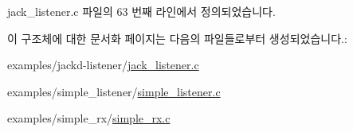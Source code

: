 jack\+\_\+listener.\+c 파일의 63 번째 라인에서 정의되었습니다.



이 구조체에 대한 문서화 페이지는 다음의 파일들로부터 생성되었습니다.\+:\begin{DoxyCompactItemize}
\item 
examples/jackd-\/listener/\hyperlink{jack__listener_8c}{jack\+\_\+listener.\+c}\item 
examples/simple\+\_\+listener/\hyperlink{simple__listener_8c}{simple\+\_\+listener.\+c}\item 
examples/simple\+\_\+rx/\hyperlink{simple__rx_8c}{simple\+\_\+rx.\+c}\end{DoxyCompactItemize}
